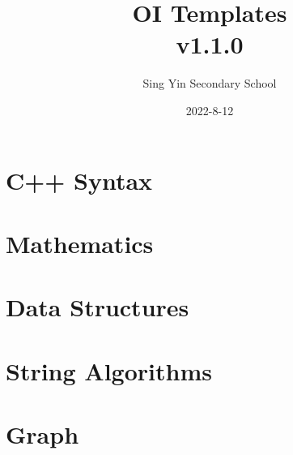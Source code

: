 \documentclass{article}
\title{%
    OI Templates \\
    \large v1.1.0}
\author{Sing Yin Secondary School}
\date{2022-8-12}
\begin{document}
\maketitle

\tableofcontents
\pagebreak

\section{C++ Syntax}



\pagebreak
\section{Mathematics}




\pagebreak
\section{Data Structures}






\pagebreak
\section{String Algorithms}



\pagebreak
\section{Graph}



\pagebreak
\end{document}

